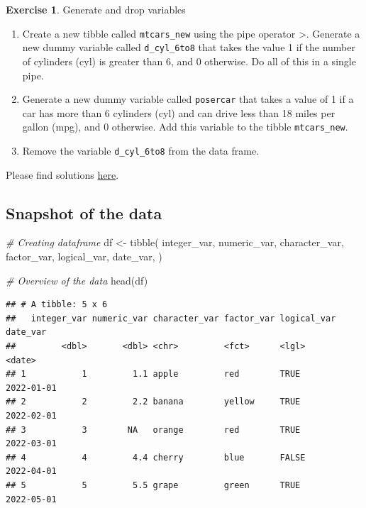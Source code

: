 \documentclass[
  12pt,
  oneside]{book}
\newenvironment{Shaded}{\begin{snugshade}}{\end{snugshade}}
\newcommand{\CommentTok}[1]{\textcolor[rgb]{0.56,0.35,0.01}{\textit{#1}}}
\newcommand{\FunctionTok}[1]{\textcolor[rgb]{0.00,0.00,0.00}{#1}}
\newcommand{\NormalTok}[1]{#1}
\newcommand{\OtherTok}[1]{\textcolor[rgb]{0.56,0.35,0.01}{#1}}
\theoremstyle{definition}
\theoremstyle{definition}
\theoremstyle{definition}
\newtheorem{exercise}{Exercise}[chapter]
\theoremstyle{definition}
\theoremstyle{remark}
\begin{document}
\begin{exercise}
\protect\hypertarget{exr:genanddrop}{}\label{exr:genanddrop}Generate and drop variables

\begin{enumerate}
\def\labelenumi{\alph{enumi})}
\item
  Create a new tibble called \texttt{mtcars\_new} using the pipe operator \textbar\textgreater. Generate a new dummy variable called \texttt{d\_cyl\_6to8} that takes the value 1 if the number of cylinders (cyl) is greater than 6, and 0 otherwise. Do all of this in a single pipe.
\item
  Generate a new dummy variable called \texttt{posercar} that takes a value of 1 if a car has more than 6 cylinders (cyl) and can drive less than 18 miles per gallon (mpg), and 0 otherwise. Add this variable to the tibble \texttt{mtcars\_new}.
\item
  Remove the variable \texttt{d\_cyl\_6to8} from the data frame.
\end{enumerate}

Please find solutions \href{https://raw.githubusercontent.com/hubchev/courses/main/scr/exe_genanddrop.R}{here}.
\end{exercise}

\hypertarget{snapshot-of-the-data}{%
\subsection{Snapshot of the data}\label{snapshot-of-the-data}}

\begin{Shaded}
\begin{Highlighting}[]
\CommentTok{\# Creating dataframe}
\NormalTok{df }\OtherTok{\textless{}{-}} \FunctionTok{tibble}\NormalTok{(}
\NormalTok{  integer\_var, numeric\_var, character\_var, factor\_var, logical\_var, date\_var,}
\NormalTok{  )}

\CommentTok{\# Overview of the data}
\FunctionTok{head}\NormalTok{(df)}
\end{Highlighting}
\end{Shaded}

\begin{verbatim}
## # A tibble: 5 x 6
##   integer_var numeric_var character_var factor_var logical_var date_var  
##         <dbl>       <dbl> <chr>         <fct>      <lgl>       <date>    
## 1           1         1.1 apple         red        TRUE        2022-01-01
## 2           2         2.2 banana        yellow     TRUE        2022-02-01
## 3           3        NA   orange        red        TRUE        2022-03-01
## 4           4         4.4 cherry        blue       FALSE       2022-04-01
## 5           5         5.5 grape         green      TRUE        2022-05-01
\end{verbatim}
\end{document}
